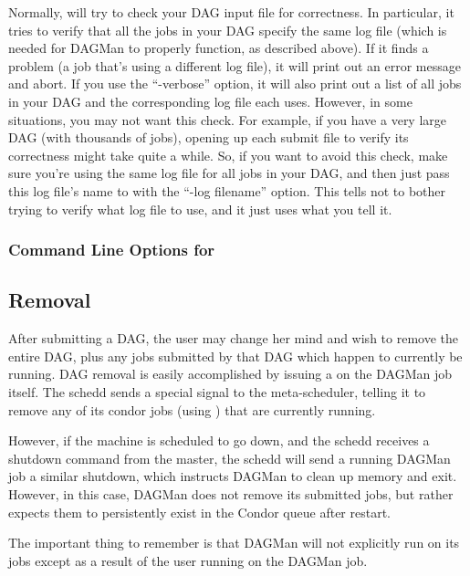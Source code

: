 Normally,  will try to check your DAG input file
for correctness.
In particular, it tries to verify that all the jobs in your DAG
specify the same log file (which is needed for DAGMan to properly
function, as described above).
If it finds a problem (a job that's using a different log file), it
will print out an error message and abort.
If you use the ``-verbose'' option, it will also print out a list of
all jobs in your DAG and the corresponding log file each uses.
However, in some situations, you may not want this check.
For example, if you have a very large DAG (with thousands of jobs),
opening up each submit file to verify its correctness might take quite
a while.
So, if you want to avoid this check, make sure you're using the same
log file for all jobs in your DAG, and then just pass this log file's
name to  with the ``-log filename'' option.
This tells  not to bother trying to verify what
log file to use, and it just uses what you tell it.

\subsubsection{Command Line Options for }

\Todo

\subsection{Removal}

After submitting a DAG, the user may change her mind and wish to remove the
entire DAG, plus any jobs submitted by that DAG which happen to currently be
running.  DAG removal is easily accomplished by issuing a  on the
DAGMan job itself.  The schedd sends a special signal to the meta-scheduler,
telling it to remove any of its condor jobs (using ) that are
currently running.

However, if the machine is scheduled to go down, and the schedd receives a
shutdown command from the master, the schedd will send a running DAGMan job a
similar shutdown, which instructs DAGMan to clean up memory and exit.
However, in this case, DAGMan does not remove its submitted jobs, but rather
expects them to persistently exist in the Condor queue after restart.

The important thing to remember is that DAGMan will not explicitly run
 on its jobs except as a result of the user running  on
the DAGMan job.

